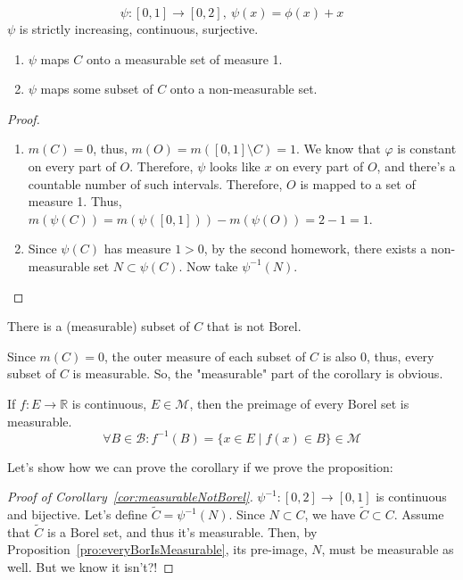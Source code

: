 \begin{definition}
    \[ \psi: [0,1] \to [0,2],\ \psi(x) = \phi(x) + x \]
    $\psi$ is strictly increasing, continuous, surjective.
\end{definition}
\begin{proposition}
    \begin{enumerate}
        \item {
            $\psi$ maps $C$ onto a measurable set of measure 1.
        }
        \item {
            $\psi$ maps some subset of $C$ onto a non-measurable set.
        }
    \end{enumerate}
\end{proposition}
\begin{proof}
    \begin{enumerate}
        \item {
            $m(C) = 0$, thus, $m(O) = m([0, 1] \setminus C) = 1$. We know that
            $\varphi$ is constant on every part of $O$.
            Therefore, $\psi$ looks like $x$ on every part of $O$,
            and there's a countable number of such intervals.
            Therefore, $O$ is mapped to a set of measure 1.
            Thus, $m(\psi(C)) = m(\psi([0, 1])) - m(\psi(O)) = 2 - 1 = 1$.
        }
        \item {
            Since $\psi(C)$ has measure $1 > 0$, by the second homework,
            there exists a non-measurable set $N \subset \psi(C)$. Now
            take $\psi^{-1}(N)$.
        }
    \end{enumerate}
\end{proof}
\begin{corollary}
    \label{cor:measurableNotBorel}
    There is a (measurable) subset of $C$ that is not Borel.
\end{corollary}
\begin{remark}
    Since $m(C) = 0$, the outer measure of each subset of $C$ is also 0,
    thus, every subset of $C$ is measurable. So, the "measurable" part of the 
    corollary is obvious.
\end{remark}
\begin{proposition}
    \label{pro:everyBorIsMeasurable}
    If $f : E \to \mathbb{R}$ is continuous, $E \in \mathcal{M}$, then
    the preimage of every Borel set is measurable.
    \[ \forall B \in \mathcal{B}: f^{-1}(B) = \{ x \in E \mid f(x) \in B \} \in \mathcal{M} \]
\end{proposition}
Let's show how we can prove the corollary if we prove the proposition:
\begin{proof}[Proof of Corollary~\ref{cor:measurableNotBorel}]
    $\psi^{-1}: [0, 2] \to [0, 1]$ is continuous and bijective.
    Let's define $\tilde{C} = \psi^{-1}(N)$. Since $N \subset C$, we have
    $\tilde{C} \subset C$.
    Assume that $\tilde{C}$ is a Borel set, and thus it's measurable.
    Then, by Proposition~\ref{pro:everyBorIsMeasurable},
    its pre-image, $N$, must be measurable as well. But we know it isn't?!
\end{proof}

